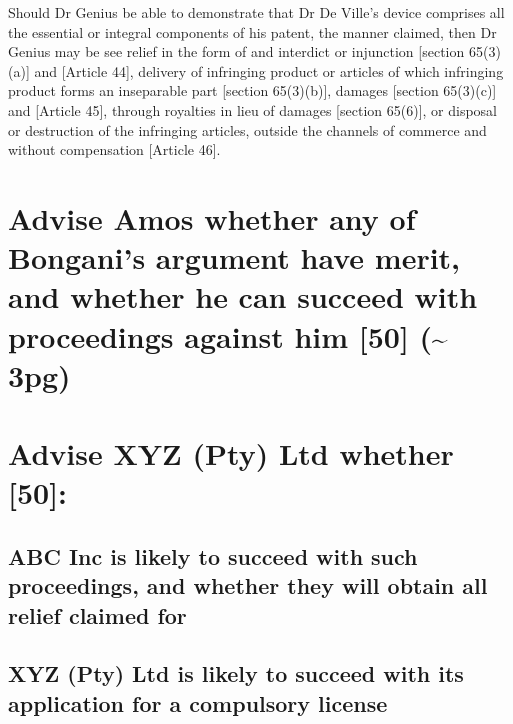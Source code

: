 \documentclass[11pt]{article}
\begin{document}
Should Dr Genius be able to demonstrate that Dr De Ville's device comprises all the essential or integral components of his patent, the manner claimed, then Dr Genius may be see relief in the form of and interdict or injunction [section 65(3)(a)]\cite{rsa78_patents_act} and [Article 44]\cite{wto17_trips}, delivery of infringing product or articles of which infringing product forms an inseparable part [section 65(3)(b)]\cite{rsa78_patents_act}, damages [section 65(3)(c)]\cite{rsa78_patents_act} and [Article 45]\cite{wto17_trips}, through royalties in lieu of damages [section 65(6)]\cite{rsa78_patents_act}, or disposal or destruction of the infringing articles, outside the channels of commerce and without compensation [Article 46]\cite{wto17_trips}.

\section{Advise Amos whether any of Bongani's argument have merit, and whether he can succeed with proceedings against him [50] (\textasciitilde{} 3pg)}
\label{sec:orgde548a4}

\section{Advise XYZ (Pty) Ltd whether [50]:}
\label{sec:org16e9f54}
\subsection{ABC Inc is likely to succeed with such proceedings, and whether they will obtain all relief claimed for}
\label{sec:orge20b8b9}
\subsection{XYZ (Pty) Ltd is likely to succeed with its application for a compulsory license}
\label{sec:org57f96bb}
\printbibliography
\end{document}
